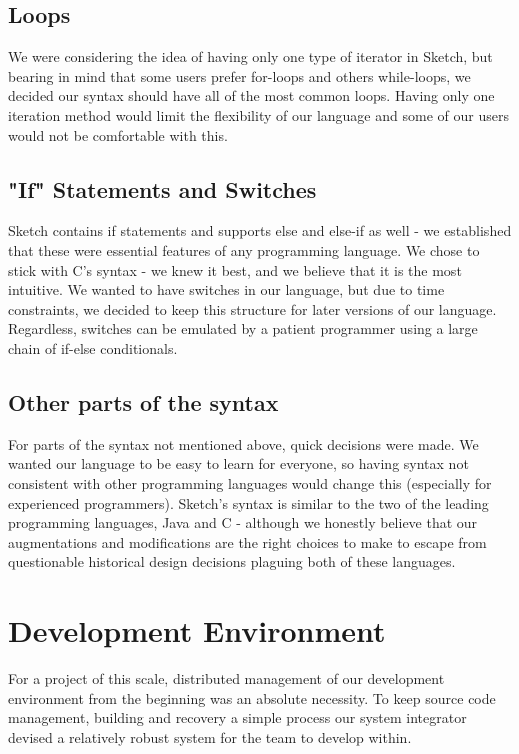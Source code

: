 \documentclass{l3proj}
\begin{document}
\section {Loops}
We were considering the idea of having only one type of iterator in Sketch, but bearing in mind that some users prefer for-loops and others while-loops, we decided our syntax should have all of the most common loops. Having only one iteration method would limit the flexibility of our language and some of our users would not be comfortable with this.
 
\section {"If" Statements and Switches}
Sketch contains if statements and supports else and else-if as well - we established that these were essential features of any programming language. We chose to stick with C's syntax - we knew it best, and we believe that it is the most intuitive. We wanted to have switches in our language, but due to time constraints, we decided to keep this structure for later versions of our language. Regardless, switches can be emulated by a patient programmer using a large chain of if-else conditionals.

\section{Other parts of the syntax}
For parts of the syntax not mentioned above, quick decisions were made. We wanted our language to be easy to learn for everyone, so having syntax not consistent with other programming languages would change this (especially for experienced programmers). Sketch's syntax is similar to the two of the leading programming languages, Java and C - although we honestly believe that our augmentations and modifications are the right choices to make to escape from questionable historical design decisions plaguing both of these languages. 

\chapter{Development Environment}
\label{dev}
For a project of this scale, distributed management of our development environment from the beginning was an absolute necessity. To keep source code management, building and recovery a simple process our system integrator devised a relatively robust system for the team to develop within.
\end{document}
